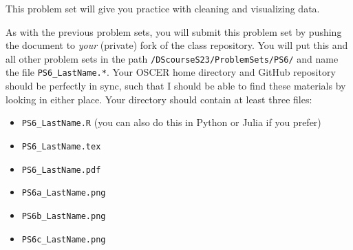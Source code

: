 \documentclass[12pt,english]{exam}
\begin{document}
This problem set will give you practice with cleaning and visualizing data.

As with the previous problem sets, you will submit this problem set by pushing the document to \emph{your} (private) fork of the class repository. You will put this and all other problem sets in the path \texttt{/DScourseS23/ProblemSets/PS6/} and name the file \texttt{PS6\_LastName.*}. Your OSCER home directory and GitHub repository should be perfectly in sync, such that I should be able to find these materials by looking in either place. Your directory should contain at least three files:
\begin{itemize}
    \item \texttt{PS6\_LastName.R} (you can also do this in Python or Julia if you prefer)
    \item \texttt{PS6\_LastName.tex}
    \item \texttt{PS6\_LastName.pdf}
    \item \texttt{PS6a\_LastName.png}
    \item \texttt{PS6b\_LastName.png}
    \item \texttt{PS6c\_LastName.png}
\end{itemize}
\end{document}
